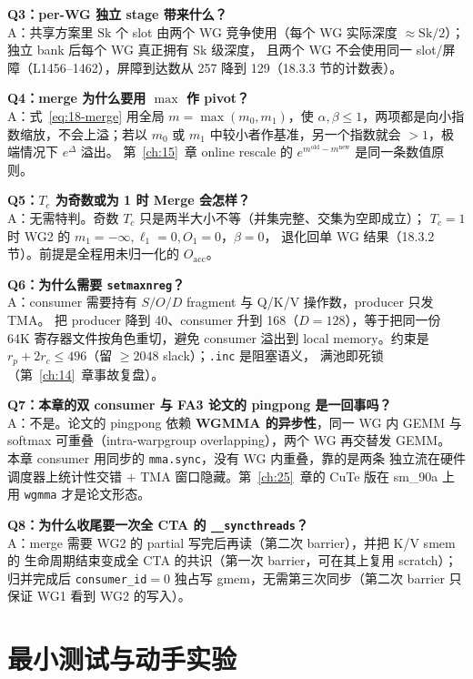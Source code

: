 \textbf{Q3：per-WG 独立 stage 带来什么？}\\
A：共享方案里 $\mathrm{Sk}$ 个 slot 由两个 WG 竞争使用（每个 WG 实际深度
$\approx \mathrm{Sk}/2$）；独立 bank 后每个 WG 真正拥有 $\mathrm{Sk}$ 级深度，
且两个 WG 不会使用同一 slot/屏障（L1456--1462），屏障到达数从 257 降到
129（18.3.3 节的计数表）。

\textbf{Q4：merge 为什么要用 $\max$ 作 pivot？}\\
A：式~\ref{eq:18-merge} 用全局 $m = \max(m_0, m_1)$，使
$\alpha, \beta \le 1$，两项都是向小指数缩放，不会上溢；若以 $m_0$ 或
$m_1$ 中较小者作基准，另一个指数就会 $> 1$，极端情况下 $e^{\Delta}$ 溢出。
第~\ref{ch:15}~章 online rescale 的 $e^{m^{\mathrm{old}}-m^{\mathrm{new}}}$
是同一条数值原则。

\textbf{Q5：$T_c$ 为奇数或为 1 时 Merge 会怎样？}\\
A：无需特判。奇数 $T_c$ 只是两半大小不等（并集完整、交集为空即成立）；
$T_c{=}1$ 时 WG2 的 $m_1 = -\infty, \ell_1 = 0, O_1 = 0$，$\beta = 0$，
退化回单 WG 结果（18.3.2 节）。前提是全程用未归一化的 $O_{\mathrm{acc}}$。

\textbf{Q6：为什么需要 \texttt{setmaxnreg}？}\\
A：consumer 需要持有 $S/O/D$ fragment 与 Q/K/V 操作数，producer 只发 TMA。
把 producer 降到 40、consumer 升到 168（$D{=}128$），等于把同一份 64K
寄存器文件按角色重切，避免 consumer 溢出到 local memory。约束是
$r_p + 2r_c \le 496$（留 $\ge 2048$ slack）；\texttt{.inc} 是阻塞语义，
满池即死锁（第~\ref{ch:14}~章事故复盘）。

\textbf{Q7：本章的双 consumer 与 FA3 论文的 pingpong 是一回事吗？}\\
A：不是。论文的 pingpong 依赖 \textbf{WGMMA 的异步性}，同一 WG 内 GEMM 与
softmax 可重叠（intra-warpgroup overlapping），两个 WG 再交替发 GEMM。
本章 consumer 用同步的 \texttt{mma.sync}，没有 WG 内重叠，靠的是两条
独立流在硬件调度器上统计性交错 $+$ TMA 窗口隐藏。第~\ref{ch:25}~章的 CuTe
版在 sm\_90a 上用 \texttt{wgmma} 才是论文形态。

\textbf{Q8：为什么收尾要一次全 CTA 的 \texttt{\_\allowbreak{}\_\allowbreak{}syncthreads}？}\\
A：merge 需要 WG2 的 partial 写完后再读（第二次 barrier），并把 K/V smem 的
生命周期结束变成全 CTA 的共识（第一次 barrier，可在其上复用 scratch）；
归并完成后
\texttt{consumer\_id}$=0$ 独占写 gmem，无需第三次同步（第二次 barrier 只保证
WG1 看到 WG2 的写入）。

\section{最小测试与动手实验}

